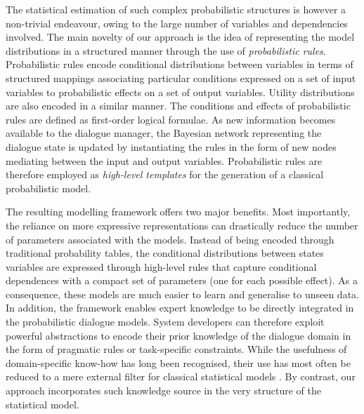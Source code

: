 The statistical estimation of such complex probabilistic structures is however a non-trivial endeavour, owing to the large number of variables and dependencies involved. The main novelty of our approach is the idea of representing the model distributions in a structured manner through the use of \textit{probabilistic rules}.  Probabilistic rules encode conditional distributions between variables in terms of structured mappings associating particular conditions expressed on a set of input variables to probabilistic effects on a set of output variables.  Utility distributions are also encoded in a similar manner. The conditions and effects of probabilistic rules are defined as first-order logical formulae. As new information becomes available to the dialogue manager, the Bayesian network representing the dialogue state is updated by instantiating the rules in the form of new nodes mediating between the input and output variables. Probabilistic rules are therefore employed as \textit{high-level templates} for the generation of a classical probabilistic model.  

The resulting modelling framework offers two major benefits. Most importantly, the reliance on more expressive representations can drastically reduce the number of parameters associated with the models.  Instead of being encoded through traditional probability tables, the conditional distributions between states variables are expressed through high-level rules that capture conditional dependences with a compact set of parameters (one for each possible effect). As a consequence, these models are much easier to learn and generalise to unseen data.  In addition, the framework enables expert knowledge to be directly integrated in the probabilistic dialogue models. System developers can therefore exploit powerful abstractions to encode their prior knowledge of the dialogue domain in the form of pragmatic rules or task-specific constraints.    
While the usefulness of domain-specific know-how has long been recognised, their use has most often be reduced to a mere external filter for classical statistical models \citep{heeman2007,williams2008}. By contrast, our approach incorporates such knowledge source in the very structure of the statistical model. 

